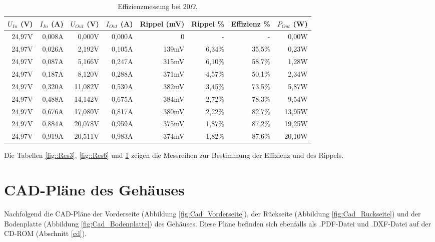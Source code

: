 \begin{table}[h]
\centering
\begin{tabular}{|r|r|r|r|r|r|r|r|}
\hline
$U_{In}$ (V) & $I_{In}$ (A) & $U_{Out}$ (V) & $I_{Out}$ (A) & Rippel (mV) & Rippel \% & Effizienz \% & $P_{Out}$ (W) \\ \hline
24,97V   & 0,008A   & 0,000V        & 0,000A        & 0           & -         & -            & 0,00W      \\ \hline
24,97V   & 0,026A   & 2,192V    & 0,105A    & 139mV         & 6,34\%      & 35,5\%         & 0,23W   \\ \hline
24,97V   & 0,087A   & 5,166V    & 0,247A    & 315mV         & 6,10\%      & 58,7\%         & 1,28W   \\ \hline
24,97V   & 0,187A   & 8,120V     & 0,288A    & 371mV         & 4,57\%      & 50,1\%         & 2,34W   \\ \hline
24,97V   & 0,320A    & 11,082V    & 0,530A     & 382mV         & 3,45\%      & 73,5\%         & 5,87W   \\ \hline
24,97V   & 0,488A   & 14,142V    & 0,675A    & 384mV         & 2,72\%      & 78,3\%         & 9,54W   \\ \hline
24,97V   & 0,676A   & 17,080V    & 0,817A    & 380mV         & 2,22\%      & 82,7\%         & 13,95W  \\ \hline
24,97V   & 0,884A   & 20,078V    & 0,959A    & 375mV         & 1,87\%      & 87,2\%         & 19,25W  \\ \hline
24,97V   & 0,919A   & 20,511V    & 0,983A     & 374mV         & 1,82\%      & 87,6\%         & 20,10W  \\ \hline
\end{tabular}
\caption{Effizienzmessung bei 20$\Omega$.}
\label{fig::Res20}
\end{table}

Die Tabellen \ref{fig::Res3}, \ref{fig::Res6} und \ref{fig::Res20} zeigen die Messreihen zur Bestimmung der Effizienz und des Rippels.
\newpage

\section{CAD-Pläne des Gehäuses}\label{cad}
Nachfolgend die CAD-Pläne der Vorderseite (Abbildung \ref{fig:Cad_Vorderseite}), der Rückseite (Abbildung \ref{fig:Cad_Ruckseite}) und der Bodenplatte (Abbildung \ref{fig:Cad_Bodenplatte}) des Gehäuses. Diese Pläne befinden sich ebenfalls als .PDF-Datei und .DXF-Datei auf der CD-ROM (Abschnitt \ref{cd}).

